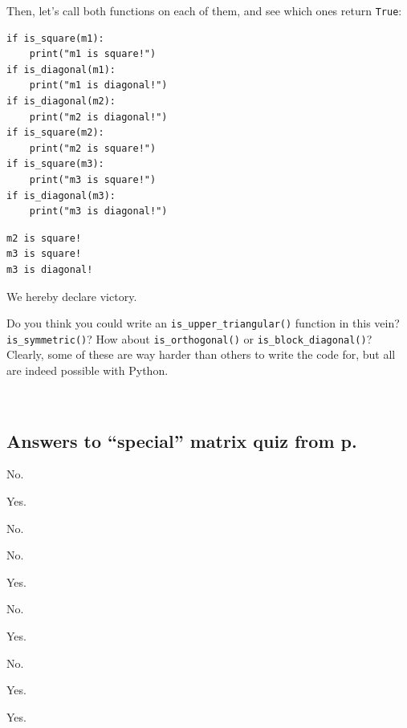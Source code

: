 Then, let's call both functions on each of them, and see which ones return
\texttt{True}:

\begin{Verbatim}[fontsize=\small,samepage=true,frame=single,framesep=3mm]
if is_square(m1):
    print("m1 is square!")
if is_diagonal(m1):
    print("m1 is diagonal!")
if is_diagonal(m2):
    print("m2 is diagonal!")
if is_square(m2):
    print("m2 is square!")
if is_square(m3):
    print("m3 is square!")
if is_diagonal(m3):
    print("m3 is diagonal!")
\end{Verbatim}
\vspace{-.2in}

\begin{Verbatim}[fontsize=\small,samepage=true,frame=leftline,framesep=5mm,framerule=1mm]
m2 is square!
m3 is square!
m3 is diagonal!
\end{Verbatim}

We hereby declare victory. 

\bigskip

Do you think you could write an \texttt{is\_upper\_triangular()} function in
this vein? \texttt{is\_symmetric()}? How about \texttt{is\_orthogonal()} or
\texttt{is\_block\_diagonal()}? Clearly, some of these are way harder than
others to write the code for, but all are indeed possible with Python.

\vspace{.4in}
\hrulefill \\

\subsection*{Answers to ``special'' matrix quiz from
p.~\pageref{specialMatrixQuiz}}

\label{specialMatrixQuizSols}

\begin{multicols}{3}
\begin{compactenum}
\item No.
\item Yes.
\item No.
\item No.
\item Yes.
\item No.
\item Yes.
\item No.
\item Yes.
\item Yes.
\end{compactenum}
\end{multicols}

